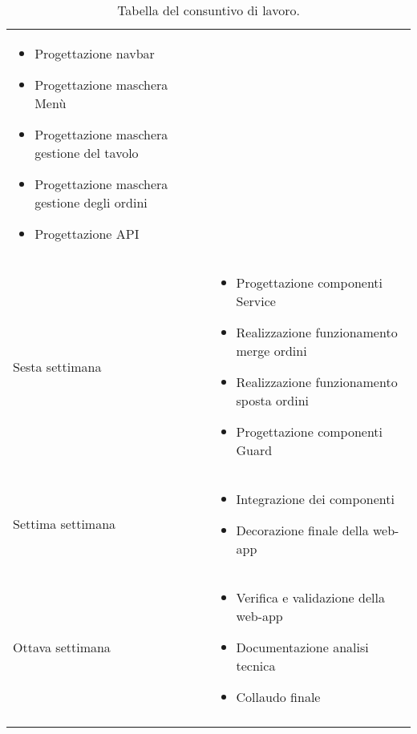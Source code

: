 \begin{center}
\begin{longtable}{ |p{3cm}|p{9cm}|  }
\begin{itemize}
            \item Progettazione navbar
            \item Progettazione maschera Menù
            \item Progettazione maschera gestione del tavolo
            \item Progettazione maschera gestione degli ordini
            \item Progettazione API
        \end{itemize}\\
        Sesta settimana&\begin{itemize}
            \item Progettazione componenti Service
            \item Realizzazione funzionamento merge ordini
            \item Realizzazione funzionamento sposta ordini
            \item Progettazione componenti Guard
        \end{itemize}\\
        Settima settimana&\begin{itemize}
            \item Integrazione dei componenti
            \item Decorazione finale della web-app
        \end{itemize}\\
        Ottava settimana&\begin{itemize}
            \item Verifica e validazione della web-app
            \item Documentazione analisi tecnica
            \item Collaudo finale
        \end{itemize}\\
\hline
\caption{\label{tab:tabella consuntivo lavoro}Tabella del consuntivo di lavoro.}
\end{longtable}
\end{center}


